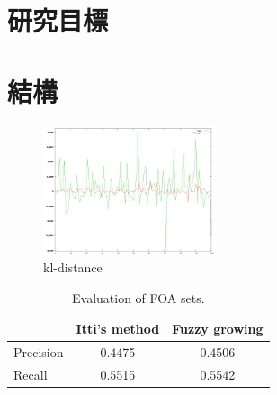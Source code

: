 \section{研究目標}

\section{結構}

\begin{figure}
\centering
\includegraphics[width=0.45\textwidth]{images/kl}
\caption{kl-distance}
\label{kl}
\end{figure}

\begin{table}[t]
\begin{center}
\begin{tabular}{lcc}

\hline
                    &  {\small Itti's method}     & {\small Fuzzy growing}    \\
\hline
{\small Precision}           &  0.4475    & 0.4506 \\
{\small Recall}              &  0.5515    & 0.5542 \\
\hline

\end{tabular}
\caption[Evaluation of FOA sets]{\small Evaluation of FOA sets. } \label{t:FOA}
\end{center}
\end{table}
